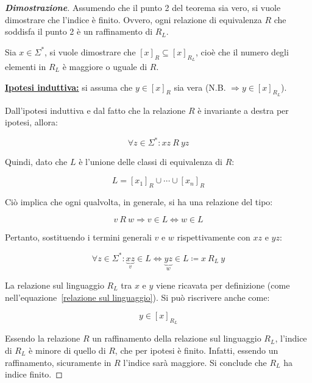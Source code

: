 \documentclass[a4paper]{article}
\begin{document}
\begin{proof}[\textbf{Dimostrazione}]
		\noindent
		Assumendo che il punto 2 del teorema sia vero, si vuole dimostrare che l'indice è finito. Ovvero, ogni relazione di equivalenza $R$ che soddisfa il punto 2 è un raffinamento di $R_{L}$.
		
		Sia $x \in \Sigma^{*}$, si vuole dimostrare che $\left[x\right]_{R} \subseteq \left[x\right]_{R_{L}}$, cioè che il numero degli elementi in $R_{L}$ è maggiore o uguale di $R$.\newline
		
		\noindent
		\textbf{\underline{Ipotesi induttiva:}} si assuma che $y \in \left[x\right]_{R}$ sia vera (N.B. $\Rightarrow y \in \left[x\right]_{R_{L}}$).
		
		\noindent
		Dall'ipotesi induttiva e dal fatto che la relazione $R$ è invariante a destra per ipotesi, allora:
		
		\begin{equation*}
			\forall z \in \Sigma^{*} : xz \: R \: yz
		\end{equation*}
	
		\noindent
		Quindi, dato che $L$ è l'unione delle classi di equivalenza di $R$:
		
		\begin{equation*}
			L = \left[x_{1}\right]_{R} \cup \cdots \cup \left[x_{n}\right]_{R}
		\end{equation*}
	
		\noindent
		Ciò implica che ogni qualvolta, in generale, si ha una relazione del tipo:
		
		\begin{equation*}
			v \: R \: w \Longrightarrow v \in L \iff w \in L
		\end{equation*}
	
		\noindent
		Pertanto, sostituendo i termini generali $v$ e $w$ rispettivamente con $xz$ e $yz$:
		
		\begin{equation*}
			\forall z \in \Sigma^{*} : \underbrace{xz}_{v} \in L \iff \underbrace{yz}_{w} \in L \coloneqq x \: R_{L} \: y
		\end{equation*}
	
		\noindent
		La relazione sul linguaggio $R_{L}$ tra $x$ e $y$ viene ricavata per definizione (come nell'equazione~\ref{relazione sul linguaggio}). Si può riscrivere anche come:
		
		\begin{equation*}
			y \in \left[x\right]_{R_{L}}
		\end{equation*}
	
		\noindent
		Essendo la relazione $R$ un raffinamento della relazione sul linguaggio $R_{L}$, l'indice di $R_{L}$ è minore di quello di $R$, che per ipotesi è finito. Infatti, essendo un raffinamento, sicuramente in $R$ l'indice sarà maggiore. Si conclude che $R_{L}$ ha indice finito.
		

\end{proof}
\end{document}
